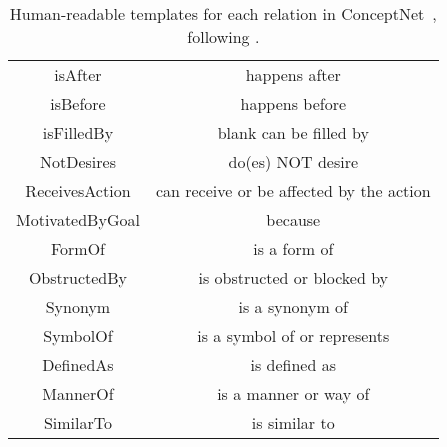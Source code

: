 \begin{table}[t!]
{\begin{tabular}{cc}
    isAfter & happens after \\    
    isBefore & happens before \\    
    isFilledBy & blank can be filled by \\    
    NotDesires & do(es) NOT desire \\    
    ReceivesAction & can receive or be affected by the action \\    
    MotivatedByGoal & because \\    
    FormOf & is a form of \\    
    ObstructedBy & is obstructed or blocked by \\    
    Synonym & is a synonym of \\    
    SymbolOf & is a symbol of or represents \\    
    DefinedAs & is defined as \\    
    MannerOf & is a manner or way of \\    
    SimilarTo & is similar to \\    \bottomrule
\end{tabular}%
}
\caption{Human-readable templates for each relation in ConceptNet~\cite{speer2017conceptnet}, following \citet{hwang2021cometatomic2020symbolicneural}.}
\end{table}